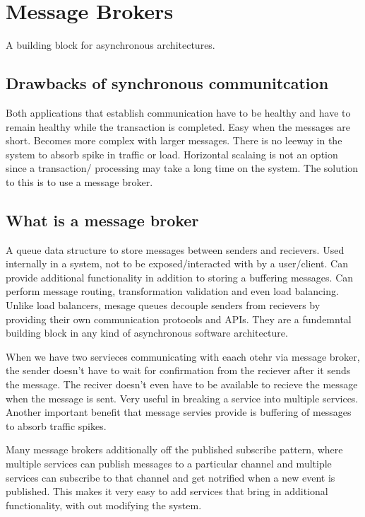 \documentclass[a4paper, 11pt]{book}
\begin{document}
    \section{Message Brokers}
    A building block for asynchronous architectures.

    \subsection{Drawbacks of synchronous communitcation}
    Both applications that establish communication have to be healthy and have to remain healthy while the transaction is completed.
    Easy when the messages are short.
    Becomes more complex with larger messages.
    There is no leeway in the system to absorb spike in traffic or load.
    Horizontal scalaing is not an option since a transaction/ processing may take a long time on the system.
    The solution to this is to use a message broker.

    \subsection{What is a message broker}
    A queue data structure to store messages between senders and recievers.
    Used internally in a system, not to be exposed/interacted with by a user/client.
    Can provide additional functionality in addition to storing a buffering messages.
    Can perform message routing, transformation validation and even load balancing.
    Unlike load balancers, mesage queues decouple senders from recievers by providing their own communication protocols and APIs.
    They are a fundemntal building block in any kind of asynchronous software architecture.

    When we have two servieces communicating with eaach otehr via message broker, the sender doesn't have to wait for confirmation from the reciever after it sends the message.
    The reciver doesn't even have to be available to recieve the message when the message is sent.
    Very useful in breaking a service into multiple services.
    Another important benefit that message servies provide is buffering of messages to absorb traffic spikes.

    Many message brokers additionally off the published subscribe pattern, where multiple services can publish messages to a particular channel and multiple services can subscribe to that channel and get notrified when a new event is published.
    This makes it very easy to add services that bring in additional functionality, with out modifying the system.
\end{document}

